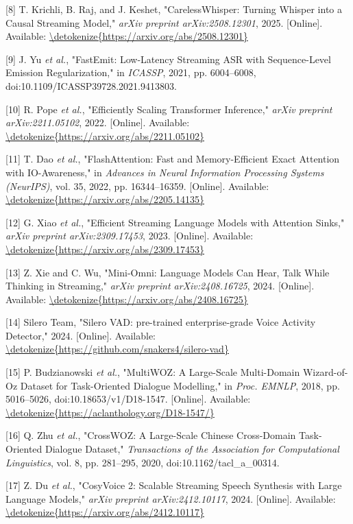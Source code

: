 \documentclass[UTF8,a4paper,12pt]{ctexart}
\begin{document}
[8] T. Krichli, B. Raj, and J. Keshet, "CarelessWhisper: Turning Whisper into a Causal Streaming Model," \textit{arXiv preprint arXiv:2508.12301}, 2025. [Online]. Available: \url{\detokenize{https://arxiv.org/abs/2508.12301}}

[9] J. Yu \textit{et al.}, "FastEmit: Low-Latency Streaming ASR with Sequence-Level Emission Regularization," in \textit{ICASSP}, 2021, pp. 6004–6008, doi:10.1109/ICASSP39728.2021.9413803.

[10] R. Pope \textit{et al.}, "Efficiently Scaling Transformer Inference," \textit{arXiv preprint arXiv:2211.05102}, 2022. [Online]. Available: \url{\detokenize{https://arxiv.org/abs/2211.05102}}

[11] T. Dao \textit{et al.}, "FlashAttention: Fast and Memory-Efficient Exact Attention with IO-Awareness," in \textit{Advances in Neural Information Processing Systems (NeurIPS)}, vol. 35, 2022, pp. 16344–16359. [Online]. Available: \url{\detokenize{https://arxiv.org/abs/2205.14135}}

[12] G. Xiao \textit{et al.}, "Efficient Streaming Language Models with Attention Sinks," \textit{arXiv preprint arXiv:2309.17453}, 2023. [Online]. Available: \url{\detokenize{https://arxiv.org/abs/2309.17453}}

[13] Z. Xie and C. Wu, "Mini-Omni: Language Models Can Hear, Talk While Thinking in Streaming," \textit{arXiv preprint arXiv:2408.16725}, 2024. [Online]. Available: \url{\detokenize{https://arxiv.org/abs/2408.16725}}

[14] Silero Team, "Silero VAD: pre-trained enterprise-grade Voice Activity Detector," 2024. [Online]. Available: \url{\detokenize{https://github.com/snakers4/silero-vad}}

[15] P. Budzianowski \textit{et al.}, "MultiWOZ: A Large-Scale Multi-Domain Wizard-of-Oz Dataset for Task-Oriented Dialogue Modelling," in \textit{Proc. EMNLP}, 2018, pp. 5016–5026, doi:10.18653/v1/D18-1547. [Online]. Available: \url{\detokenize{https://aclanthology.org/D18-1547/}}

[16] Q. Zhu \textit{et al.}, "CrossWOZ: A Large-Scale Chinese Cross-Domain Task-Oriented Dialogue Dataset," \textit{Transactions of the Association for Computational Linguistics}, vol. 8, pp. 281–295, 2020, doi:10.1162/tacl\_a\_00314.

[17] Z. Du \textit{et al.}, "CosyVoice 2: Scalable Streaming Speech Synthesis with Large Language Models," \textit{arXiv preprint arXiv:2412.10117}, 2024. [Online]. Available: \url{\detokenize{https://arxiv.org/abs/2412.10117}}
\end{document}
